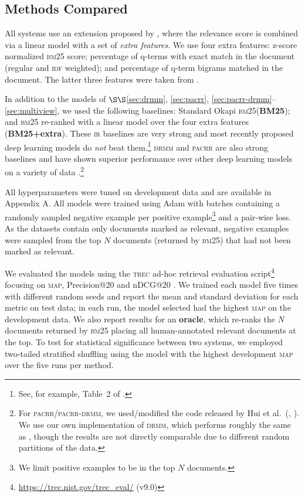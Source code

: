 \documentclass[11pt,a4paper]{article}
\newcommand{\ir}{\textsc{ir}\xspace}
\newcommand{\trec}{\textsc{trec}\xspace}
\newcommand{\drmm}{\textsc{drmm}\xspace}
\newcommand{\pacrr}{\textsc{pacrr}\xspace}
\newcommand{\pacrrdrmm}{\textsc{pacrr-drmm}\xspace}
\newcommand{\bmtf}{\textsc{bm25}\xspace}
\newcommand{\idf}{\textsc{idf}\xspace}
\newcommand{\map}{\textsc{map}\xspace}
\begin{document}
\subsection{Methods Compared}

All systems use an extension proposed by , where the relevance score is combined via a linear model with a set of \emph{extra features}. We use four extra features: z-score normalized \bmtf score; percentage of 
q-terms with exact match in the document (regular and \idf weighted); and percentage of 
q-term bigrams matched in the document. The latter three features were taken from .

In addition to the models  
of $\S\S$\ref{sec:drmm}, \ref{sec:pacrr}, \ref{sec:pacrr-drmm}--\ref{sec:multiview}, we used the following baselines:
Standard Okapi \bmtf (\textbf{BM25}); and \bmtf re-ranked with a linear model over the four extra features (\textbf{BM25+extra}).
These \ir baselines are very strong and most recently proposed deep learning models do \emph{not} beat them.\footnote{See, for example, Table~2 of .} 
\drmm and \pacrr are also strong baselines
and have shown superior performance over other deep 
learning models on a variety of data \cite{guo2016deep,hui2017pacrr}.\footnote{For \pacrr/\pacrrdrmm, we used/modified the code released by Hui et al.\ (\citeyear{hui2017pacrr}, \citeyear{hui2018copacrr}). We use our own implementation of \drmm, which performs roughly the same as , though the results are not directly comparable due to different random partitions of the data.}

All hyperparameters were tuned on 
development data and are available in Appendix A.
All models were trained using Adam \cite{kingma2014adam} with batches containing a randomly sampled negative example per positive example\footnote{We limit positive 
examples to be in the top $N$ documents.} 
and a pair-wise loss. 
As the datasets contain only documents marked as relevant, negative examples were sampled from the top $N$ documents (returned by \bmtf) that had not been marked as relevant.

We evaluated the models using the \trec ad-hoc retrieval evaluation script\footnote{\url{https://trec.nist.gov/trec\_eval/} (v9.0)} focusing on \map, Precision@20 and nDCG@20
\cite{manning2008ir}. We trained each model five times with different random seeds and report the mean and standard deviation for each metric on test data; in each run, the model selected had the highest \map on the development data.
We also report results for an \textbf{oracle}, which re-ranks the $N$ documents returned by \bmtf placing all human-annotated relevant documents at the top. 
To test 
for statistical significance between two systems, we employed two-tailed stratified shuffling 
\cite{smucker2007comparison,Dror2017HitchhikersGuide}
using the model with the highest development \map over the five runs per method.
\end{document}
